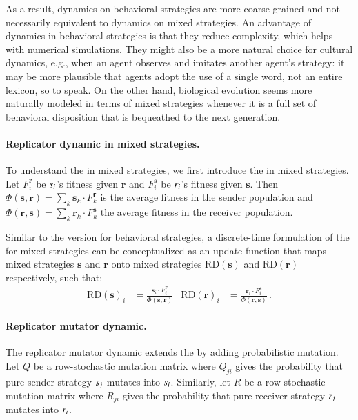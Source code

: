 \documentclass[fleqn,reqno,10pt]{article}
\renewcommand{\Smixed}{\ensuremath{\mathrm{\mathbf{s}}}}
\renewcommand{\Rmixed}{\ensuremath{\mathrm{\mathbf{r}}}}
\newcommand{\rd}{\acro{rd}} %
\newcommand{\rmd}{\acro{rmd}} %
\newcommand{\RD}{\ensuremath{\mathrm{RD}}} %
\begin{document}
As a result, dynamics on behavioral strategies are more coarse-grained
and not necessarily equivalent to dynamics on mixed strategies. An
advantage of dynamics in behavioral strategies is that they reduce
complexity, which helps with numerical simulations. They might also be
a more natural choice for cultural dynamics, e.g., when an agent
observes and imitates another agent's strategy: it may be more
plausible that agents adopt the use of a single word, not an entire
lexicon, so to speak. On the other hand, biological evolution seems
more naturally modeled in terms of mixed strategies whenever it is a
full set of behavioral disposition that is bequeathed to the next
generation.

\paragraph{Replicator dynamic in mixed strategies.} To understand the
\rmd in mixed strategies, we first introduce the \rd in mixed
strategies. Let $F_i^{\Rmixed}$ be $s_i$'s fitness given
$\Rmixed$ and $F_i^{\Smixed}$ be $r_i$'s fitness given
$\Smixed$. Then $\Phi(\Smixed,\Rmixed) = \sum_{k} \Smixed_k \cdot
F_k^{\Rmixed}$ is the average fitness in the sender population and
$\Phi(\Rmixed,\Smixed) = \sum_{k} \Rmixed_k \cdot F_k^{\Smixed}$ the
average fitness in the receiver population.

Similar to the version for behavioral strategies, a discrete-time
formulation of the \rd for mixed strategies can be conceptualized as an
update function that maps mixed strategies $\Smixed$ and $\Rmixed$
onto mixed strategies $\RD(\Smixed)$ and $\RD(\Rmixed)$ respectively,
such that:
\begin{align*}
  \RD(\Smixed)_i & = \frac{\Smixed_i \cdot F_i^{\Rmixed}}{
    \Phi(\Smixed,\Rmixed)} & \RD(\Rmixed)_i & = \frac{\Rmixed_i \cdot
    F_i^{\Smixed}}{ \Phi(\Rmixed,\Smixed)} \,.
\end{align*}


\paragraph{Replicator mutator dynamic.} The replicator mutator dynamic
extends the \rd by adding probabilistic mutation. Let $Q$ be a
row-stochastic mutation matrix where $Q_{ji}$ gives the probability
that pure sender strategy $s_j$ mutates into
$s_i$. Similarly, let $R$ be a row-stochastic mutation matrix
where $R_{ji}$ gives the probability that pure receiver strategy
$r_j$ mutates into $r_i$.
\end{document}
